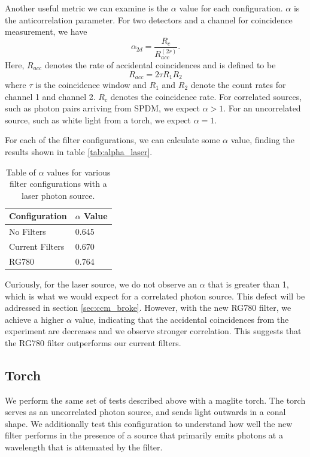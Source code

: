 \documentclass[letterpaper, 11 pt]{book}
\begin{document}
Another useful metric we can examine is the $\alpha$ value for each configuration.
$\alpha$ is the anticorrelation parameter. For two detectors and a channel for coincidence measurement,
we have
\begin{equation}
    \alpha_{2d} = \frac{R_c}{R^{(2r)}_{acc}}.
\end{equation}
Here, $R_{acc}$ denotes the rate of accidental coincidences and is defined to be
\begin{equation}
    R_{acc} = 2\tau R_1 R_2
\end{equation}
where $\tau$ is the coincidence window and $R_1$ and $R_2$ denote the count rates
for channel 1 and channel 2. $R_c$ denotes the coincidence rate. For correlated sources, such as photon pairs arriving from SPDM, we expect $\alpha > 1$.
For an uncorrelated source, such as white light from a torch, we expect $\alpha = 1$.

For each of the filter configurations, we can calculate some $\alpha$ value, finding the
results shown in table \ref{tab:alpha_laser}.
\begin{table}[H]
    \centering
    \begin{tabular}{|l|l|}
    \hline
    \textbf{Configuration} & \textbf{$\alpha$ Value} \\ \hline
    No Filters             & 0.645                   \\ \hline
    Current Filters        & 0.670                   \\ \hline
    RG780                  & 0.764                   \\ \hline
    \end{tabular}
    \caption{Table of $\alpha$ values for various filter configurations with a laser photon source.}
\end{table}\label{tab:alpha_laser}
Curiously, for the laser source, we do not observe an $\alpha$ that is greater than 1, which is
what we would expect for a correlated photon source. This defect will be addressed in section \ref{sec:ccm_broke}.
However, with the new RG780 filter, we achieve a higher $\alpha$ value, indicating that the accidental coincidences
from the experiment are decreases and we observe stronger correlation. This suggests that the RG780 filter outperforms
our current filters.

\subsection{Torch}
We perform the same set of tests described above with a maglite torch. The torch serves
as an uncorrelated photon source, and sends light outwards in a conal shape. We additionally test
this configuration to understand how well the new filter performs in the presence of a source
that primarily emits photons at a wavelength that is attenuated by the filter.
\end{document}
